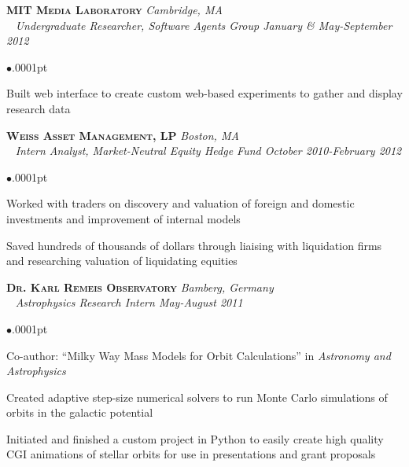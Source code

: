 \documentclass[11pt]{article}
\newcommand{\employer}[4]{{\hspace*{-20pt} {\small{\textbf{\textsc{ #1}}}} \hfill \small{\emph{#2}}\\ ~\hspace*{-20pt} \small \emph{ #3 \hfill #4}}\\ }
\newenvironment{achievements}{\begin{list}{$\bullet$}{\topsep .0001pt \itemsep -2pt}}{\vspace*{5pt}\end{list} }
\begin{document}
\employer{MIT Media Laboratory} {Cambridge, MA} {Undergraduate Researcher, Software Agents Group} {January \& May-September 2012}
\begin{achievements}
\item Built web interface to create custom web-based experiments to gather and display research data
\end{achievements}

\employer{Weiss Asset Management, LP} {Boston, MA} {Intern Analyst, Market-Neutral Equity Hedge Fund} {October 2010-February 2012}
	\begin{achievements}
	\item Worked with traders on discovery and valuation of foreign and domestic investments  and improvement of internal models
		\item Saved hundreds of thousands of dollars through liaising with liquidation firms and researching valuation of liquidating equities 
 
	\end{achievements}
	
\employer{Dr. Karl Remeis Observatory}{Bamberg, Germany}{Astrophysics Research Intern} {May-August 2011}
\begin{achievements}
\item Co-author: ``Milky Way Mass Models for Orbit Calculations'' in \emph{Astronomy and Astrophysics} 
\item Created adaptive step-size numerical solvers to run Monte Carlo simulations of orbits in the galactic potential
\item Initiated and finished a custom project in Python to easily create high quality CGI animations of stellar orbits for use in presentations and grant proposals\end{achievements}

\end{document}
